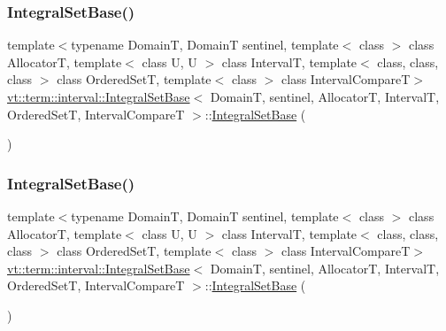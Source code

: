 \subsubsection{\texorpdfstring{Integral\+Set\+Base()}{IntegralSetBase()}\hspace{0.1cm}{\footnotesize\ttfamily [2/4]}}
{\footnotesize\ttfamily template$<$typename DomainT, DomainT sentinel, template$<$ class $>$ class AllocatorT, template$<$ class U, U $>$ class IntervalT, template$<$ class, class, class $>$ class Ordered\+SetT, template$<$ class $>$ class Interval\+CompareT$>$ \\
\hyperlink{structvt_1_1term_1_1interval_1_1_integral_set_base}{vt\+::term\+::interval\+::\+Integral\+Set\+Base}$<$ DomainT, sentinel, AllocatorT, IntervalT, Ordered\+SetT, Interval\+CompareT $>$\+::\hyperlink{structvt_1_1term_1_1interval_1_1_integral_set_base}{Integral\+Set\+Base} (\begin{DoxyParamCaption}\item[{\hyperlink{structvt_1_1term_1_1interval_1_1_integral_set_base}{Integral\+Set\+Base}$<$ DomainT, sentinel, AllocatorT, IntervalT, Ordered\+SetT, Interval\+CompareT $>$ const \&}]{ }\end{DoxyParamCaption})\hspace{0.3cm}{\ttfamily [default]}}

\mbox{\label{structvt_1_1term_1_1interval_1_1_integral_set_base_a54265fe55a770f1d7dc880f013fdb99c}} 
\subsubsection{\texorpdfstring{Integral\+Set\+Base()}{IntegralSetBase()}\hspace{0.1cm}{\footnotesize\ttfamily [3/4]}}
{\footnotesize\ttfamily template$<$typename DomainT, DomainT sentinel, template$<$ class $>$ class AllocatorT, template$<$ class U, U $>$ class IntervalT, template$<$ class, class, class $>$ class Ordered\+SetT, template$<$ class $>$ class Interval\+CompareT$>$ \\
\hyperlink{structvt_1_1term_1_1interval_1_1_integral_set_base}{vt\+::term\+::interval\+::\+Integral\+Set\+Base}$<$ DomainT, sentinel, AllocatorT, IntervalT, Ordered\+SetT, Interval\+CompareT $>$\+::\hyperlink{structvt_1_1term_1_1interval_1_1_integral_set_base}{Integral\+Set\+Base} (\begin{DoxyParamCaption}\item[{\hyperlink{structvt_1_1term_1_1interval_1_1_integral_set_base}{Integral\+Set\+Base}$<$ DomainT, sentinel, AllocatorT, IntervalT, Ordered\+SetT, Interval\+CompareT $>$ \&\&}]{ }\end{DoxyParamCaption})\hspace{0.3cm}{\ttfamily [default]}}

